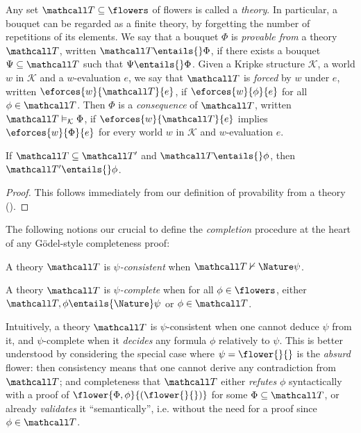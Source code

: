 \begin{scope}
\begin{definition}[Theory]
  Any set $\tT \subseteq \flowers$ of flowers is called a \emph{theory}. In
  particular, a bouquet can be regarded as a finite theory, by forgetting the
  number of repetitions of its elements. We say that a bouquet $\Phi$ is
  \emph{provable from} a theory $\tT$, written $\tT \entails{} \Phi$, if there exists a
  bouquet $\Psi \subseteq \tT$ such that $\Psi \entails{} \Phi$. Given a Kripke
  structure $\mathcal{K}$, a world $w$ in $\mathcal{K}$ and a $w$-evaluation
  $e$, we say that $\tT$ is \emph{forced} by $w$ under $e$, written
  $\eforces{w}{\tT}{e}$, if $\eforces{w}{\phi}{e}$ for all $\phi \in \tT$. Then
  $\Phi$ is a \emph{consequence} of $\tT$, written $\tT \vDash_{\mathcal{K}} \Phi$,
  if $\eforces{w}{\tT}{e}$ implies $\eforces{w}{\Phi}{e}$ for every world $w$ in
  $\mathcal{K}$ and $w$-evaluation $e$.
\end{definition}

\begin{lemma}[Weakening]
  If $\tT \subseteq \tT'$ and $\tT \entails{} \phi$, then $\tT' \entails{} \phi$.
\end{lemma}
\begin{proof}
  This follows immediately from our definition of provability from a theory
  ().
\end{proof}

The following notions our crucial to define the \emph{completion} procedure at
the heart of any Gödel-style completeness proof:

\begin{definition}
  A theory $\tT$ is \emph{$\psi$-consistent} when $\tT \nvdash{\Nature} \psi$.
\end{definition}

\begin{definition}
  A theory $\tT$ is \emph{$\psi$-complete} when for all $\phi \in \flowers$,
  either $\tT, \phi \entails{\Nature} \psi$ or $\phi \in \tT$.
\end{definition}

Intuitively, a theory $\tT$ is $\psi$-consistent when one cannot deduce $\psi$
from it, and $\psi$-complete when it \emph{decides} any formula $\phi$
relatively to $\psi$. This is better understood by considering the special case
where $\psi = \flower{{}}{{}}$ is the \emph{absurd} flower: then consistency
means that one cannot derive any contradiction from $\tT$; and completeness that
$\tT$ either \emph{refutes} $\phi$ syntactically with a proof of $\flower{\Phi,
\phi}{(\flower{}{})}$ for some $\Phi \subseteq \tT$, or already \emph{validates}
it ``semantically'', i.e. without the need for a proof since $\phi \in \tT$.


\end{scope}
